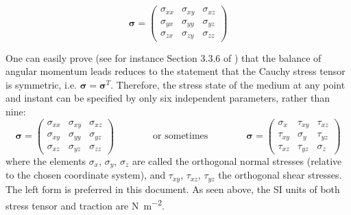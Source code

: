 \begin{tiny}
\begin{equation}
{\bm \sigma}=
\left(
\begin{array}{ccc}
\sigma_{xx} & \sigma_{xy} & \sigma_{xz} \\
\sigma_{yx} & \sigma_{yy} & \sigma_{yz} \\
\sigma_{zx} & \sigma_{zy} & \sigma_{zz} 
\end{array}
\right)
\end{equation}
\end{tiny}

One can easily prove (see for instance Section 3.3.6 of \cite{grbl09}) that the balance 
of angular momentum leads reduces to the statement that the Cauchy stress tensor 
is symmetric, i.e. ${\bm \sigma}={\bm \sigma}^T$.
Therefore, the stress state of the medium at any point and instant can be specified by only six independent parameters, rather than nine:
\begin{equation}
{\bm \sigma}=
\left(
\begin{array}{ccc}
\sigma_{xx} & \sigma_{xy} & \sigma_{xz} \\
\sigma_{xy} & \sigma_{yy} & \sigma_{yz} \\
\sigma_{xz} & \sigma_{yz} & \sigma_{zz} 
\end{array}
\right)
\qquad\qquad
\text{or sometimes}
\qquad\qquad
{\bm \sigma}=
\left(
\begin{array}{ccc}
\sigma_{x}  & \tau_{xy}  & \tau_{xz} \\
\tau_{xy}   & \sigma_{y} & \tau_{yz} \\
\tau_{xz}   & \tau_{yz}  & \sigma_{z} 
\end{array}
\right)
\end{equation}
where the elements $\sigma _{x}$, $\sigma _{y}$, $\sigma _{z}$ are called the orthogonal 
normal stresses (relative to the chosen coordinate system), and $\tau _{xy}$, $\tau _{xz}$,
$\tau _{yz}$ the orthogonal shear stresses. The left form is preferred in this document.
As seen above, the SI units of both stress tensor and traction are \si{\newton\per\square\metre}.


